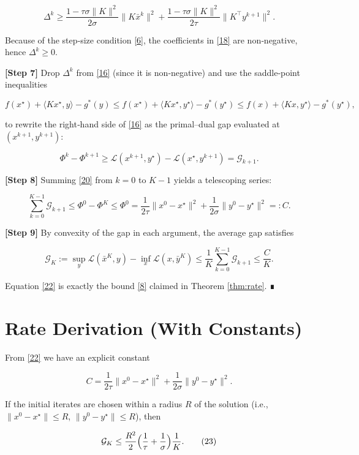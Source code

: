 \documentclass{article}
\begin{document}
\[
\Delta^{k}\ge
\frac{1-\tau\sigma\|K\|^{2}}{2\sigma}\|K\bar x^{k}\|^{2}
+\frac{1-\tau\sigma\|K\|^{2}}{2\tau}\|K^{\top}y^{k+1}\|^{2}.
\tag{18}
\]

Because of the step‑size condition \eqref{6}, the coefficients in \eqref{18} are non‑negative, hence $\Delta^{k}\ge0$.  

\noindent\textbf{[Step 7]} Drop $\Delta^{k}$ from \eqref{16} (since it is non‑negative) and use the saddle‑point inequalities  

\[
f(x^{\star})+ \langle Kx^{\star},y\rangle - g^{*}(y)
\le
f(x^{\star})+ \langle Kx^{\star},y^{\star}\rangle - g^{*}(y^{\star})
\le
f(x)+ \langle Kx, y^{\star}\rangle - g^{*}(y^{\star}),
\tag{19}
\]

to rewrite the right‑hand side of \eqref{16} as the primal–dual gap evaluated at $(x^{k+1},y^{k+1})$:

\[
\Phi^{k}-\Phi^{k+1}
\ge
\mathcal{L}(x^{k+1},y^{\star})-\mathcal{L}(x^{\star},y^{k+1})
=
\mathcal{G}_{k+1}.
\tag{20}
\]

\noindent\textbf{[Step 8]} Summing \eqref{20} from $k=0$ to $K-1$ yields a telescoping series:

\[
\sum_{k=0}^{K-1}\mathcal{G}_{k+1}
\le
\Phi^{0}-\Phi^{K}
\le
\Phi^{0}
= \frac{1}{2\tau}\|x^{0}-x^{\star}\|^{2}
  +\frac{1}{2\sigma}\|y^{0}-y^{\star}\|^{2}
=: C.
\tag{21}
\]

\noindent\textbf{[Step 9]} By convexity of the gap in each argument, the average gap satisfies  

\[
\mathcal{G}_{K}
:=\sup_{y}\mathcal{L}(\bar x^{K},y)-\inf_{x}\mathcal{L}(x,\bar y^{K})
\le
\frac{1}{K}\sum_{k=0}^{K-1}\mathcal{G}_{k+1}
\le \frac{C}{K}.
\tag{22}
\]

Equation \eqref{22} is exactly the bound \eqref{8} claimed in Theorem \ref{thm:rate}. ∎

\section*{Rate Derivation (With Constants)}
From \eqref{22} we have an explicit constant  

\[
C=
\frac{1}{2\tau}\|x^{0}-x^{\star}\|^{2}
+\frac{1}{2\sigma}\|y^{0}-y^{\star}\|^{2}.
\]

If the initial iterates are chosen within a radius $R$ of the solution (i.e., $\|x^{0}-x^{\star}\|\le R$, $\|y^{0}-y^{\star}\|\le R$), then  

\[
\mathcal{G}_{K}\le \frac{R^{2}}{2}\Bigl(\frac{1}{\tau}+\frac{1}{\sigma}\Bigr)\frac{1}{K}.
\tag{23}
\]
\end{document}
